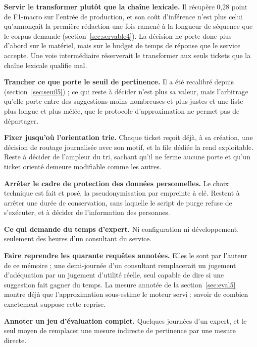 \begin{puces}
\item \textbf{Servir le transformer plutôt que la chaîne lexicale.} Il récupère 0,28 point de
F1-macro sur l'entrée de production, et son coût d'inférence n'est plus celui qu'annonçait la
première rédaction une fois ramené à la longueur de séquence que le corpus demande
(section~\ref{sec:servable4}). La décision ne porte donc plus d'abord sur le matériel, mais sur le
budget de temps de réponse que le service accepte. Une voie intermédiaire réserverait le
transformer aux seuls tickets que la chaîne lexicale qualifie mal.
\item \textbf{Trancher ce que porte le seuil de pertinence.} Il a été recalibré depuis
(section~\ref{sec:seuil5}) ; ce qui reste à décider n'est plus sa valeur, mais l'arbitrage qu'elle
porte entre des suggestions moins nombreuses et plus justes et une liste plus longue et plus mêlée,
que le protocole d'approximation ne permet pas de départager.
\item \textbf{Fixer jusqu'où l'orientation trie.} Chaque ticket reçoit déjà, à sa création, une
décision de routage journalisée avec son motif, et la file dédiée la rend exploitable. Reste à
décider de l'ampleur du tri, sachant qu'il ne ferme aucune porte et qu'un ticket orienté demeure
modifiable comme les autres.
\item \textbf{Arrêter le cadre de protection des données personnelles.} Le choix technique est fait
et posé, la pseudonymisation par empreinte à clé. Restent à arrêter une durée de conservation,
sans laquelle le script de purge refuse de s'exécuter, et à décider de l'information des personnes.
\end{puces}

\textbf{Ce qui demande du temps d'expert.} Ni configuration ni développement, seulement des heures
d'un consultant du service.

\begin{puces}
\item \textbf{Faire reprendre les quarante requêtes annotées.} Elles le sont par l'auteur de ce
mémoire ; une demi-journée d'un consultant remplacerait un jugement d'adéquation par un jugement
d'utilité réelle, seul capable de dire si une suggestion fait gagner du temps. La mesure annotée de
la section~\ref{sec:eval5} montre déjà que l'approximation sous-estime le moteur servi ; savoir de
combien exactement suppose cette reprise.
\item \textbf{Annoter un jeu d'évaluation complet.} Quelques journées d'un expert, et le seul moyen
de remplacer une mesure indirecte de pertinence par une mesure directe.
\end{puces}

